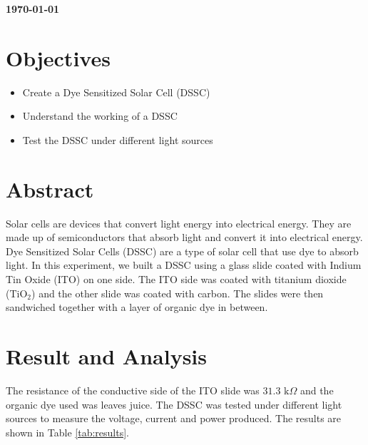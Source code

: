 \documentclass[a4paper, 12pt, english]{article}
\begin{document}
\begin{titlepage}
	\par
	\vfill
	\begin{center}
		\textbf{\today}\\
	\end{center}

\end{titlepage}



\newpage
\section{Objectives}
\begin{itemize}
	\item Create a Dye Sensitized Solar Cell (DSSC)
	\item Understand the working of a DSSC
	\item Test the DSSC under different light sources
\end{itemize}

\section{Abstract}
Solar cells are devices that convert light energy into electrical energy. They
are made up of semiconductors that absorb light and convert it into electrical
energy. Dye Sensitized Solar Cells (DSSC) are a type of solar cell that use dye
to absorb light. In this experiment, we built a DSSC using a glass slide coated
with Indium Tin Oxide (ITO) on one side. The ITO side was coated with titanium
dioxide (TiO$_2$) and the other slide was coated with carbon. The slides were
then sandwiched together with a layer of organic dye in between.

\section{Result and Analysis}
The resistance of the conductive side of the ITO slide was $31.3 \text{ k}
	\Omega$ and the organic dye used was leaves juice. The DSSC was tested under
different light sources to measure the voltage, current and power produced. The
results are shown in Table \ref{tab:results}.
\end{document}

